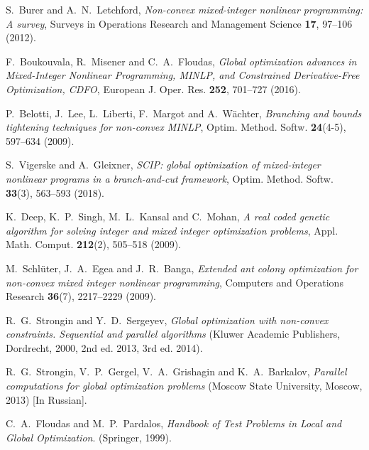 \documentclass[
11pt,%
tightenlines,%
twoside,%
onecolumn,%
nofloats,%
nobibnotes,%
nofootinbib,%
superscriptaddress,%
noshowpacs,%
centertags]%
{revtex4}
\begin{document}
\begin{thebibliography}{99}

S.~Burer and A.~N.~Letchford, \textit{Non-convex mixed-integer nonlinear programming: A survey}, Surveys in Operations Research and Management Science \textbf{17}, 97--106 (2012).

F.~Boukouvala, R.~Misener and C.~A.~Floudas, \textit{Global optimization advances in Mixed-Integer Nonlinear Programming, MINLP, and Constrained Derivative-Free Optimization, CDFO}, European J. Oper. Res. \textbf{252}, 701--727 (2016).

P.~Belotti, J.~Lee, L.~Liberti, F.~Margot and A.~W\"achter, \textit{Branching and bounds tightening techniques for non-convex MINLP}, Optim. Method. Softw. \textbf{24}(4-5), 597--634 (2009).

S.~Vigerske and A.~Gleixner, \textit{SCIP: global optimization of mixed-integer nonlinear programs in a branch-and-cut framework}, Optim. Method. Softw. \textbf{33}(3), 563--593 (2018).

K.~Deep, K.~P.~Singh, M.~L.~Kansal and C.~Mohan, \textit{A real coded genetic algorithm for solving integer and mixed integer optimization problems}, Appl. Math. Comput. \textbf{212}(2), 505--518 (2009).

M.~Schl\"uter, J.~A.~Egea and J.~R.~Banga, \textit{Extended ant colony optimization for non-convex mixed integer nonlinear programming}, Computers and Operations Research \textbf{36}(7), 2217--2229 (2009).
	
R.~G.~Strongin and Y.~D.~Sergeyev, \textit{Global optimization with non-convex constraints. Sequential and parallel algorithms} (Kluwer Academic Publishers, Dordrecht, 2000, 2nd ed. 2013, 3rd ed. 2014).

R.~G.~Strongin, V.~P.~Gergel, V.~A.~Grishagin and K.~A.~Barkalov, \textit{Parallel computations for global optimization problems} (Moscow State University, Moscow, 2013) [In Russian].

C.~A.~Floudas and M.~P.~Pardalos,  \textit{Handbook of Test Problems in Local and Global Optimization}. (Springer, 1999).  %



\end{thebibliography}
\end{document}
